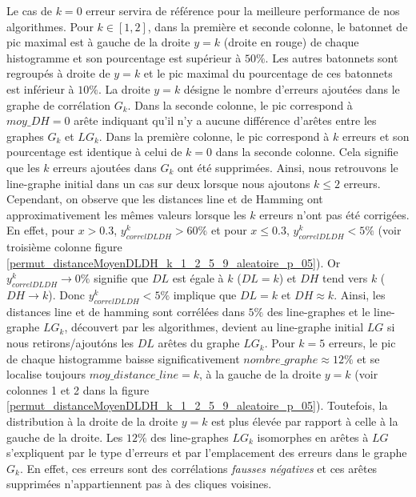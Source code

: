 Le cas de $k=0$ erreur servira de r\'ef\'erence pour la meilleure performance de nos algorithmes.
\newline
Pour $k \in [1,2]$, dans la premi\`ere et seconde colonne, le batonnet de pic maximal est \`a gauche de la droite $y = k$ (droite en rouge) de chaque histogramme et  son pourcentage est sup\'erieur \`a $50 \%$. Les autres batonnets sont regroup\'es \`a droite de $y = k$ et le pic maximal du pourcentage de ces batonnets est inf\'erieur \`a $10\%$. La droite $y = k$ d\'esigne le nombre d'erreurs ajout\'ees dans le graphe de corr\'elation $G_k$.
Dans la seconde colonne, le pic correspond \`a $moy\_DH = 0$ ar\^ete indiquant qu'il n'y a aucune diff\'erence d'ar\^etes entre les  graphes $G_k$ et $LG_k$. Dans la premi\`ere colonne, le pic correspond \`a $k$ erreurs et son pourcentage est identique \`a celui de $k=0$ dans la seconde colonne. Cela signifie que les $k$ erreurs ajout\'ees dans $G_k$ ont \'et\'e supprim\'ees. Ainsi, nous retrouvons le line-graphe initial dans un cas sur deux lorsque nous ajoutons $k \le 2$ erreurs.
Cependant, on observe que les distances line et de Hamming  ont approximativement les m\^emes valeurs lorsque les $k$ erreurs n'ont pas \'et\'e corrig\'ees. 
En effet, pour $x > 0.3$, $y_{correlDLDH}^{k} > 60\%$ et  pour $x \le 0.3$, $y_{correlDLDH}^{k} < 5\%$ (voir troisi\`eme colonne figure \ref{permut_distanceMoyenDLDH_k_1_2_5_9_aleatoire_p_05}). Or $y_{correlDLDH}^{k} \rightarrow 0\%$ signifie que $DL$ est \'egale \`a $k$ ($DL = k$) et $DH$ tend vers $k$ ($DH \rightarrow k$). Donc $y_{correlDLDH}^{k} < 5\%$ implique que $DL = k$ et $DH \approx k$.
Ainsi, les distances line et de hamming sont corr\'el\'ees dans $5\%$ des line-graphes et le line-graphe $LG_k$, d\'ecouvert par les algorithmes, devient  au line-graphe initial $LG$ si nous retirons/ajout\'ons les $DL$ ar\^etes du graphe $LG_k$.
\newline
Pour $k  = 5$ erreurs,  le pic de chaque histogramme baisse significativement $nombre\_graphe \approx 12 \%$ et se localise toujours $moy\_distance\_line = k$, \`a la gauche de la droite $y = k$ (voir colonnes 1 et 2 dans la figure \ref{permut_distanceMoyenDLDH_k_1_2_5_9_aleatoire_p_05}). 
Toutefois, la distribution \`a la droite de la droite  $y = k$ est plus \'elev\'ee par rapport \`a celle \`a la gauche de la droite.
Les $12\%$ des line-graphes $LG_k$ isomorphes en ar\^etes \`a $LG$ s'expliquent  par le type d'erreurs et par l'emplacement des erreurs dans le graphe $G_k$. En effet, ces erreurs sont des corr\'elations {\em fausses n\'egatives} et ces ar\^etes supprim\'ees n'appartiennent pas \`a des cliques voisines.
